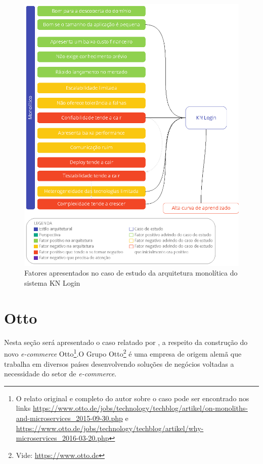 \begin{figure}[h]
  \centering
  \includegraphics[keepaspectratio=true,scale=1]{figuras/analise-knlogin.eps}
  \caption{Fatores apresentados no caso de estudo da arquitetura monolítica do sistema KN Login\label{fig:monoKN}}
\end{figure}

\section{Otto}

Nesta seção será apresentado o caso relatado por  , a
respeito da construção do novo \textit{e-commerce} Otto\footnote{O relato original e completo do autor
sobre o caso pode ser encontrado nos links
\url{https://www.otto.de/jobs/technology/techblog/artikel/on-monoliths-and-microservices_2015-09-30.php}
e \url{https://www.otto.de/jobs/technology/techblog/artikel/why-microservices_2016-03-20.php}}.O Grupo
Otto\footnote{Vide: \url{https://www.otto.de}} é uma empresa de origem alemã que trabalha em diversos países
desenvolvendo soluções de negócios voltadas a necessidade do setor de \textit{e-commerce}.

